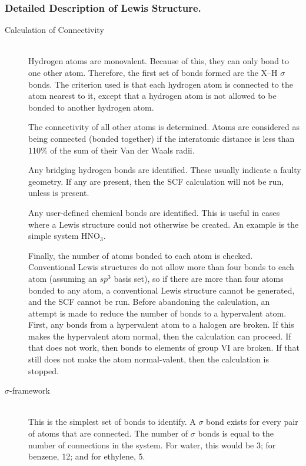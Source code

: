 \subsubsection{Detailed Description of Lewis Structure.}
\begin{description}
\item[Calculation of Connectivity]~\\
Hydrogen atoms are monovalent.  Because of this, they can only bond to one
other atom.  Therefore, the first set of bonds formed are the X--H $\sigma$
bonds.  The criterion used is that each hydrogen atom is connected to the atom
nearest to it, except that a hydrogen atom is not allowed to be bonded to
another hydrogen atom.

The connectivity of all other atoms is determined.  Atoms are considered as
being connected (bonded together) if the interatomic distance is less than
110\% of the sum of their Van der Waals radii.

Any bridging hydrogen bonds are identified.  These usually indicate a faulty
geometry.  If any are present, then the SCF calculation will not be run, unless
 is present.

Any user-defined chemical bonds are identified. This is useful in cases where a
Lewis structure could not otherwise be created.  An example is the simple
system HNO$_3$.

Finally, the number of atoms bonded to each atom is checked.  Conventional
Lewis structures do not allow more than four bonds to each atom (assuming an
$sp^3$ basis set), so if there are more than four atoms bonded to any atom, a
conventional Lewis structure cannot be generated, and the SCF cannot be run. 
Before abandoning the calculation, an attempt is made to reduce the number of
bonds to a hypervalent atom.  First, any bonds from a hypervalent atom to a
halogen are broken.  If this makes the hypervalent atom normal, then the
calculation can proceed.  If that does not work, then bonds to elements of
group VI are broken.  If that still does not make the atom normal-valent, then
the  calculation is stopped.

\item[$\sigma$-framework]~\\
This is the simplest set of bonds to identify.  A $\sigma$ bond exists for
every pair of atoms that are connected.  The number of $\sigma$ bonds is equal
to the number of connections in the system.  For water, this would be 3; for
benzene, 12; and for ethylene, 5.


\end{description}
